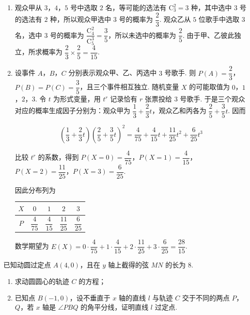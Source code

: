 \begin{solution}
\begin{enumerate}
\item 观众甲从 \(3\)，\(4\)，\(5\) 号中选取 \(2\) 名，等可能的选法有 \(\mathrm C_3^2=3\) 种，其中选中 \(3\) 号的选法有 \(2\) 种，所以观众甲选中 \(3\) 号的概率为 \(\dfrac23\). 观众乙从 \(5\) 位歌手中选取 \(3\) 名，选中 \(3\) 号的概率为 \(\dfrac{\mathrm C_4^2}{\mathrm C_5^3}=\dfrac35\)，所以未选中的概率为 \(\dfrac25\). 由于甲、乙彼此独立，所求概率为 \(\dfrac23\times\dfrac25=\dfrac4{15}\).
\item 设事件 \(A\)，\(B\)，\(C\) 分别表示观众甲、乙、丙选中 \(3\) 号歌手. 则 \(P(A)=\dfrac23\)，\(P(B)=P(C)=\dfrac35\)，且三个事件相互独立. 随机变量 \(X\) 的可能取值为 \(0\)，\(1\)，\(2\)，\(3\). 令 \(t\) 为形式变量，用 \(t^r\) 记录恰有 \(r\) 张票投给 \(3\) 号歌手. 于是三个观众对应的概率生成因子分别为：观众甲为 \(\dfrac13+\dfrac23t\)，观众乙和丙各为 \(\dfrac25+\dfrac35t\). 因而

\[
\left(\dfrac13+\dfrac23t\right)\left(\dfrac25+\dfrac35t\right)^2
=\dfrac4{75}+\dfrac4{15}t+\dfrac{11}{25}t^2+\dfrac6{25}t^3
\]

比较 \(t^r\) 的系数，得到 \(P(X=0)=\dfrac4{75}\)，\(P(X=1)=\dfrac4{15}\)，\(P(X=2)=\dfrac{11}{25}\)，\(P(X=3)=\dfrac6{25}\).

因此分布列为

\begin{center}
\begin{tabular}{c|cccc}
\(X\) & \(0\) & \(1\) & \(2\) & \(3\) \\
\hline
\(P\) & \(\dfrac4{75}\) & \(\dfrac4{15}\) & \(\dfrac{11}{25}\) & \(\dfrac6{25}\)
\end{tabular}
\end{center}

数学期望为 \(E(X)=0\cdot\dfrac4{75}+1\cdot\dfrac4{15}+2\cdot\dfrac{11}{25}+3\cdot\dfrac6{25}=\dfrac{28}{15}\).
\end{enumerate}
\end{solution}

\begin{problem}
已知动圆过定点 \(A(4,0)\)，且在 \(y\) 轴上截得的弦 \(MN\) 的长为 \(8\).

\begin{enumerate}
\item 求动圆圆心的轨迹 \(C\) 的方程；
\item 已知点 \(B(-1,0)\)，设不垂直于 \(x\) 轴的直线 \(l\) 与轨迹 \(C\) 交于不同的两点 \(P\)，\(Q\)，若 \(x\) 轴是 \(\angle PBQ\) 的角平分线，证明直线 \(l\) 过定点.
\end{enumerate}
\end{problem}

